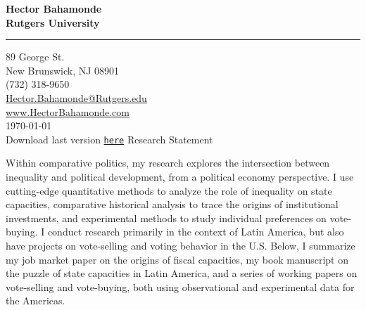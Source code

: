 \documentclass[11pt]{letter} %
\date{}
\begin{document}

\begin{letter}{} 


\begin{center}
\large\bf Hector Bahamonde \\ %
Rutgers University\\
\vspace{20pt} \hrule height 1pt %
89 George St. \\ New Brunswick, NJ 08901 \\ (732) 318-9650 \\ 
{\normalfont\normalsize\href{mailto:hector.bahamonde@rutgers.edu}{Hector.Bahamonde@Rutgers.edu}} \\
{\normalfont\normalsize\href{http://www.hectorbahamonde.com}{www.HectorBahamonde.com}}\\
{\normalfont \scriptsize{
\vspace{5mm}\today\\
Download last version \href{http://github.com/hbahamonde/Job_Market/raw/master/Bahamonde_Research_Statement.pdf}{\texttt{here}}}} %
{\huge\vspace{8mm} Research Statement}
\end{center} 


\opening{} 
 
Within comparative politics, my research explores the intersection between inequality and political development, from a political economy perspective. I use cutting-edge quantitative methods to analyze the role of inequality on state capacities, comparative historical analysis to trace the origins of institutional investments, and experimental methods to study individual preferences on vote-buying. I conduct research primarily in the context of Latin America, but also have projects on vote-selling and voting behavior in the U.S. Below, I summarize my job market paper on the origins of fiscal capacities, my book manuscript on the puzzle of state capacities in Latin America, and a series of working papers on vote-selling and vote-buying, both using observational and experimental data for the Americas.


\end{letter}
\end{document}

